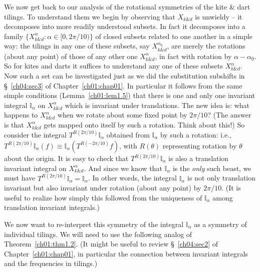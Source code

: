 \documentclass[reqno]{stml-l}
\theoremstyle{plain}
\theoremstyle{definition}
\numberwithin{equation}{chapter}
\begin{document}
We now get back to our analysis of the rotational symmetries of the kite \& dart tilings. To understand them we begin by observing that $X_{k\& d}$ is unwieldy -- it decomposes into more readily understood subsets. In fact it decomposes into a family $\{X_{k\& d}^{\alpha}:\alpha\in[0,2\pi/10)\}$ of closed subsets related to one another in a simple way: the tilings in any one of these subsets, say $X_{k\& d}^{\alpha_{0}}$, are merely the rotations (about any point) of those of any other one $X_{k\& d}^{\alpha}$, in fact with rotation by $\alpha-\alpha_{0}$. So for kites and darts it suffices to understand any one of these subsets $X_{k\& d}^{\alpha}$. Now such a set can be investigated just as we did the substitution subshifts in \S~\ref{ch04:sec3} of Chapter~\ref{ch01:chap01}. In particular it follows from the same simple conditions (Lemma~\ref{ch01:lem1.5}) that there is one and only one invariant integral $\mathbb{I}_{\alpha}$ on $X_{k\& d}^{\alpha}$ which is invariant under translations. The new idea is: what happens to $X_{k\& d}^{\alpha}$ when we rotate about some fixed point by $2\pi/10$? (The answer is that $X_{k\& d}^{\alpha}$ gets mapped onto itself by such a rotation. Think about this!) So consider the integral $T^{R(2\pi/10)}\mathbb{I}_{\alpha}$ obtained from $\mathbb{I}_{\alpha}$ by such a rotation: i.e., $T^{R(2\pi/10)}\mathbb{I}_{\alpha}(f)\equiv \mathbb{I}_{\alpha}(T^{R(-2\pi/10)}f)$, with $R(\theta)$ representing rotation by $\theta$ about the origin. It is easy to check that $T^{R(2\pi/10)}\mathbb{I}_{\alpha}$ is also a translation invariant integral on $X_{k\& d}^{\alpha}$. And since we know that $\mathbb{I}_{\alpha}$ is the \emph{only} such beast, we must have $T^{R(2\pi/10)}\mathbb{I}_{\alpha}=\mathbb{I}_{\alpha}$. In other words, the integral $\mathbb{I}_{\alpha}$ is not only translation invariant but also invariant under rotation (about any point) by $2\pi/10$. (It is useful to realize how simply this followed from the uniqueness of $\mathbb{I}_{\alpha}$ among translation invariant integrals.)

We now want to re-interpret this symmetry of the integral $\mathbb{I}_{\alpha}$ as a symmetry of individual tilings. We will need to use the following analog of Theorem~\ref{ch01:thm1.2}. (It might be useful to review \S~\ref{ch04:sec2} of Chapter~\ref{ch01:chap01}, in particular the connection between invariant integrals and the frequencies in tilings.)
\end{document}
